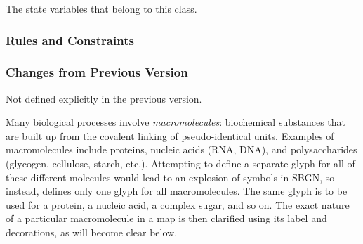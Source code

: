 \begin{attributes}
 The state variables
  that belong to this class.
\end{attributes}

\subsubsection{Rules and Constraints}

\begin{valrules}
\end{valrules}


\subsubsection{Changes from Previous Version}

Not defined explicitly in the previous version.

\label{sec:techref:macromolecule}

Many biological processes involve \emph{macromolecules}: biochemical
substances that are built up from the covalent linking of
pseudo-identical units.  Examples of macromolecules include proteins,
nucleic acids (RNA, DNA), and polysaccharides (glycogen, cellulose,
starch, etc.).  Attempting to define a separate glyph for all of these
different molecules would lead to an explosion of symbols in SBGN, so
instead, \SBGNPDLone defines only one glyph for all macromolecules.
The same glyph is to be used for a protein, a nucleic acid, a complex
sugar, and so on.  The exact nature of a particular macromolecule in a
map is then clarified using its label and decorations, as will become
clear below.

